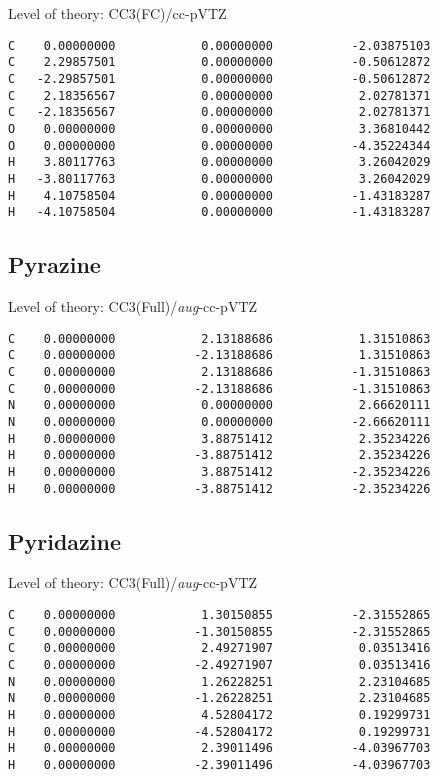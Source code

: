 \documentclass[journal=jctcce,manuscript=article,layout=traditional]{achemso}
\newcommand{\TZ}{cc-pVTZ}
\newcommand{\AVTZ}{\emph{aug}-cc-pVTZ}
\begin{document}
\begin{singlespace}
Level of theory: CC3(FC)/{\TZ}
\begin{verbatim}
C    0.00000000            0.00000000           -2.03875103 
C    2.29857501            0.00000000           -0.50612872 
C   -2.29857501            0.00000000           -0.50612872 
C    2.18356567            0.00000000            2.02781371 
C   -2.18356567            0.00000000            2.02781371 
O    0.00000000            0.00000000            3.36810442 
O    0.00000000            0.00000000           -4.35224344 
H    3.80117763            0.00000000            3.26042029 
H   -3.80117763            0.00000000            3.26042029 
H    4.10758504            0.00000000           -1.43183287 
H   -4.10758504            0.00000000           -1.43183287 
\end{verbatim}
\end{singlespace}

\subsection*{Pyrazine}

\begin{singlespace}
Level of theory: CC3(Full)/{\AVTZ}
\begin{verbatim}
C    0.00000000            2.13188686            1.31510863   
C    0.00000000           -2.13188686            1.31510863   
C    0.00000000            2.13188686           -1.31510863   
C    0.00000000           -2.13188686           -1.31510863  
N    0.00000000            0.00000000            2.66620111    
N    0.00000000            0.00000000           -2.66620111    
H    0.00000000            3.88751412            2.35234226   
H    0.00000000           -3.88751412            2.35234226   
H    0.00000000            3.88751412           -2.35234226   
H    0.00000000           -3.88751412           -2.35234226  
\end{verbatim}
\end{singlespace}

\subsection*{Pyridazine}

\begin{singlespace}
Level of theory: CC3(Full)/{\AVTZ}
\begin{verbatim}
C    0.00000000            1.30150855           -2.31552865
C    0.00000000           -1.30150855           -2.31552865
C    0.00000000            2.49271907            0.03513416
C    0.00000000           -2.49271907            0.03513416
N    0.00000000            1.26228251            2.23104685
N    0.00000000           -1.26228251            2.23104685
H    0.00000000            4.52804172            0.19299731
H    0.00000000           -4.52804172            0.19299731
H    0.00000000            2.39011496           -4.03967703
H    0.00000000           -2.39011496           -4.03967703
\end{verbatim}
\end{singlespace}
\end{document}
